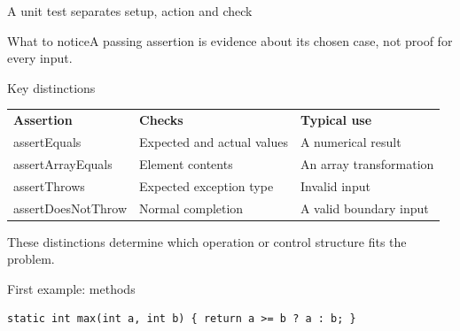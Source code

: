 \documentclass[10pt,aspectratio=169]{beamer}
\begin{document}
\begin{frame}[fragile,t]{A unit test separates setup, action and check}
\begin{center}\end{center}
\begin{block}{What to notice}A passing assertion is evidence about its chosen case, not proof for every input.\end{block}
\end{frame}
\begin{frame}[fragile,t]{Key distinctions}
\small\renewcommand{\arraystretch}{1.5}
\begin{tabularx}{\textwidth}{>{\raggedright\arraybackslash}X>{\raggedright\arraybackslash}X>{\raggedright\arraybackslash}X}
\rowcolor{navy}
\color{white}\bfseries Assertion & \color{white}\bfseries Checks & \color{white}\bfseries Typical use\\
assertEquals & Expected and actual values & A numerical result\\
assertArrayEquals & Element contents & An array transformation\\
assertThrows & Expected exception type & Invalid input\\
assertDoesNotThrow & Normal completion & A valid boundary input\\
\end{tabularx}
\vspace{3mm}\footnotesize These distinctions determine which operation or control structure fits the problem.
\end{frame}

\begin{frame}[fragile,t]{First example: methods}
\begin{lstlisting}
static int max(int a, int b) { return a >= b ? a : b; }
\end{lstlisting}
\end{frame}
\end{document}
